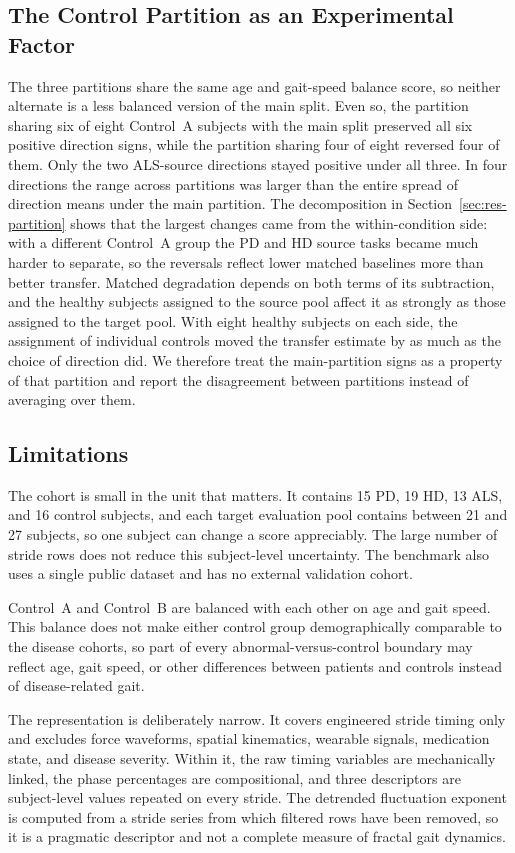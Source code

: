 \documentclass[conference]{IEEEtran}
\begin{document}
\subsection{The Control Partition as an Experimental Factor}
The three partitions share the same age and gait-speed balance score, so neither alternate is a less balanced version of the main split. Even so, the partition sharing six of eight Control~A subjects with the main split preserved all six positive direction signs, while the partition sharing four of eight reversed four of them. Only the two ALS-source directions stayed positive under all three. In four directions the range across partitions was larger than the entire spread of direction means under the main partition. The decomposition in Section~\ref{sec:res-partition} shows that the largest changes came from the within-condition side: with a different Control~A group the PD and HD source tasks became much harder to separate, so the reversals reflect lower matched baselines more than better transfer. Matched degradation depends on both terms of its subtraction, and the healthy subjects assigned to the source pool affect it as strongly as those assigned to the target pool. With eight healthy subjects on each side, the assignment of individual controls moved the transfer estimate by as much as the choice of direction did. We therefore treat the main-partition signs as a property of that partition and report the disagreement between partitions instead of averaging over them.

\subsection{Limitations}
The cohort is small in the unit that matters. It contains 15 PD, 19 HD, 13 ALS, and 16 control subjects, and each target evaluation pool contains between 21 and 27 subjects, so one subject can change a score appreciably. The large number of stride rows does not reduce this subject-level uncertainty. The benchmark also uses a single public dataset and has no external validation cohort.

Control~A and Control~B are balanced with each other on age and gait speed. This balance does not make either control group demographically comparable to the disease cohorts, so part of every abnormal-versus-control boundary may reflect age, gait speed, or other differences between patients and controls instead of disease-related gait.

The representation is deliberately narrow. It covers engineered stride timing only and excludes force waveforms, spatial kinematics, wearable signals, medication state, and disease severity. Within it, the raw timing variables are mechanically linked, the phase percentages are compositional, and three descriptors are subject-level values repeated on every stride. The detrended fluctuation exponent is computed from a stride series from which filtered rows have been removed, so it is a pragmatic descriptor and not a complete measure of fractal gait dynamics.
\end{document}

